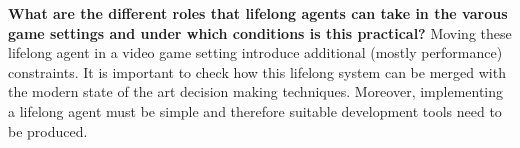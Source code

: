 \begin{goals}
%
\item \textbf{What are the different roles that lifelong agents can take in the varous game settings and under which conditions is this practical?} Moving these lifelong agent in a video game setting introduce additional (mostly performance) constraints. It is important to check how this lifelong system can be merged with the modern state of the art decision making techniques. Moreover, implementing a lifelong agent must be simple and therefore suitable development tools need to be produced.
\end{goals}